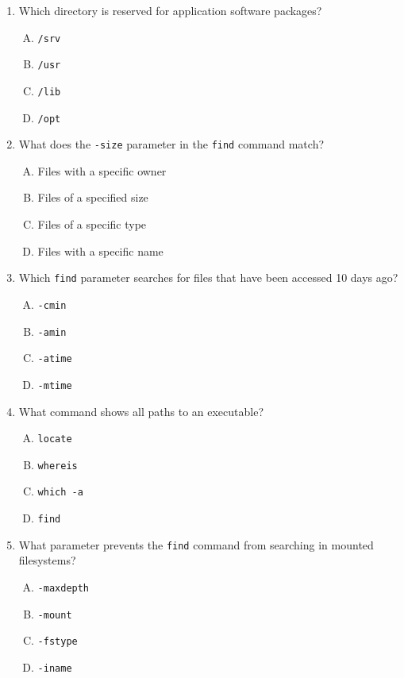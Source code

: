 \documentclass[a4paper]{report}
\begin{document}
\begin{enumerate}[1.]
    \item Which directory is reserved for application software packages?  
    \begin{enumerate}[A)]
        \item \texttt{/srv}  
        \item \texttt{/usr}  
        \item \texttt{/lib}  
        \item \texttt{/opt}  
    \end{enumerate}

    \item What does the \texttt{-size} parameter in the \texttt{find} command match?  
    \begin{enumerate}[A)]
        \item Files with a specific owner  
        \item Files of a specified size  
        \item Files of a specific type  
        \item Files with a specific name  
    \end{enumerate}

    \item Which \texttt{find} parameter searches for files that have been accessed 10 days ago?  
    \begin{enumerate}[A)]
        \item \texttt{-cmin}  
        \item \texttt{-amin}  
        \item \texttt{-atime}  
        \item \texttt{-mtime}  
    \end{enumerate}

    \item What command shows all paths to an executable?  
    \begin{enumerate}[A)]
        \item \texttt{locate}  
        \item \texttt{whereis}  
        \item \texttt{which -a}  
        \item \texttt{find}  
    \end{enumerate}

    \item What parameter prevents the \texttt{find} command from searching in mounted filesystems?  
    \begin{enumerate}[A)]
        \item \texttt{-maxdepth}  
        \item \texttt{-mount}  
        \item \texttt{-fstype}  
        \item \texttt{-iname}  
    \end{enumerate}


\end{enumerate}
\end{document}
